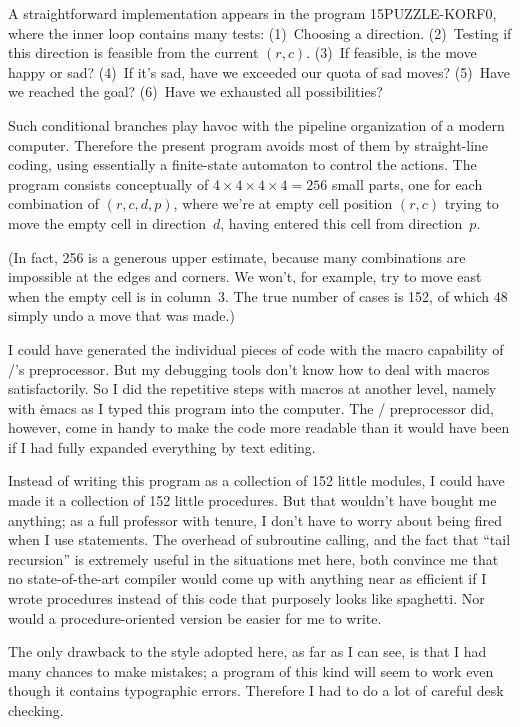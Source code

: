 A straightforward implementation appears in the program {\mc 15PUZZLE-KORF0},
where the inner loop contains many tests:
(1)~Choosing a direction. (2)~Testing if this direction is feasible
from the current $(r,c)$. (3)~If feasible, is the move happy or sad?
(4)~If it's sad, have we exceeded our quota of sad moves?
(5)~Have we reached the goal? (6)~Have we exhausted all possibilities?

Such conditional branches play havoc with the pipeline organization of
a modern computer. Therefore the present program avoids most of them
by straight-line coding, using essentially a finite-state automaton
to control the actions. The program consists conceptually of $4\times4\times
4\times4=256$ small parts, one for each combination of $(r,c,d,p)$,
where we're at empty cell position $(r,c)$ trying to move the empty
cell in direction~$d$, having entered this cell from direction~$p$.

(In fact, 256 is a generous upper estimate, because many combinations
are impossible at the edges and corners. We won't, for example, try
to move east when the empty cell is in column~3. The true number of
cases is 152, of which 48 simply undo a move that was made.)

I could have generated the individual pieces of code with the macro
capability of \CEE/'s preprocessor. But my debugging tools don't know
how to deal with macros satisfactorily. So I did the repetitive steps
with macros at another level, namely with \.{emacs} as I typed this
program into the computer. The \CEE/ preprocessor did, however, come in handy
to make the code more readable than it would have been if I had
fully expanded everything by text editing.

Instead of writing this program as a collection of 152 little modules,
I could have made it a collection of 152 little procedures. But that
wouldn't have bought me anything; as a full professor with tenure,
I don't have to worry about being fired when I use  statements.
The overhead of subroutine calling, and the fact that ``tail recursion''
is extremely useful in the situations met here, both convince me that
no state-of-the-art compiler would come up with anything near as efficient
if I wrote procedures instead of this code that purposely looks like
spaghetti. Nor would a procedure-oriented version be easier for me to write.

The only drawback to the style adopted here, as far as I can
see, is that I had many chances to make mistakes; a program of this kind
will seem to work even though it contains typographic errors.
Therefore I had to do a lot of careful desk checking.

